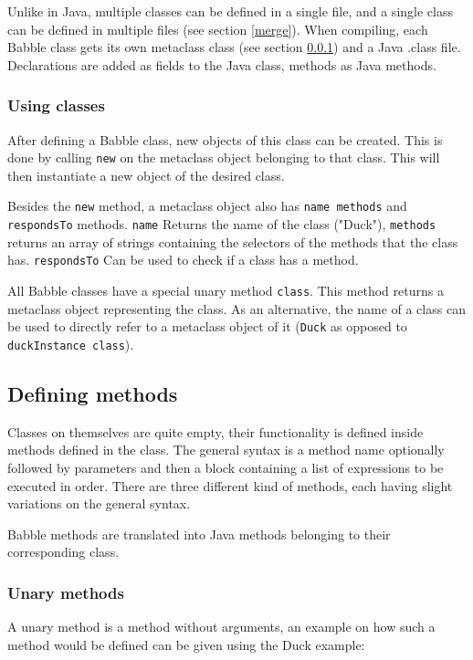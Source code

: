 \documentclass[a4paper]{article}
\begin{document}
Unlike in Java, multiple classes can be defined in a single file, and a single class can be defined in multiple files (see section \ref{merge}). When compiling, each Babble class gets its own metaclass class (see section \ref{metaclass}) and a Java .class file. Declarations are added as fields to the Java class, methods as Java methods.

\subsubsection{Using classes}
\label{metaclass}
After defining a Babble class, new objects of this class can be created. This is done by calling \texttt{new} on the metaclass object belonging to that class. This will then instantiate a new object of the desired class.

Besides the \texttt{new} method, a metaclass object also has \texttt{name methods} and \texttt{respondsTo} methods. \texttt{name} Returns the name of the class ("Duck"), \texttt{methods} returns an array of strings containing the selectors of the methods that the class has. \texttt{respondsTo} Can be used to check if a class has a method.

All Babble classes have a special unary method \texttt{class}. This method returns a metaclass object representing the class. As an alternative, the name of a class can be used to directly refer to a metaclass object of it (\texttt{Duck} as opposed to \texttt{duckInstance class}).


\subsection{Defining methods}

Classes on themselves are quite empty, their functionality is defined inside methods defined in the class. The general syntax is a method name optionally followed by parameters and then a block containing a list of expressions to be executed in order.
There are three different kind of methods, each having slight variations on the general syntax.

Babble methods are translated into Java methods belonging to their corresponding class.


\subsubsection{Unary methods}

A unary method is a method without arguments, an example on how such a method would be defined can be given using the Duck example:
\end{document}
